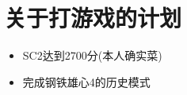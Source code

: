 \documentclass[utf8]{ctexart}
\begin{document}
		\section{关于打游戏的计划}
		\begin{itemize}
				\item SC2达到2700分(本人确实菜)
				\item 完成钢铁雄心4的历史模式	
		\end{itemize}
		
		

		
		
\end{document}
